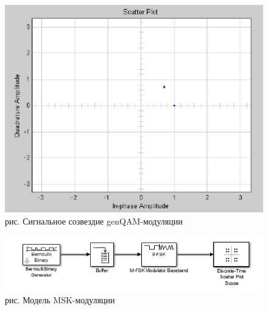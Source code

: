 \documentclass[10pt,a4paper]{report}
\begin{document}
\begin{figure}
\begin{center}
\includegraphics[width=150mm, scale = 0.9]{9_28}\newline
рис. Сигнальное созвездие genQAM-модуляции\newline
\end{center}
\end{figure}
\clearpage
\begin{figure}
\begin{center}
\includegraphics[width=150mm, scale = 0.9]{9_29}\newline
рис. Модель MSK-модуляции\newline
\end{center}
\end{figure}
\end{document}
